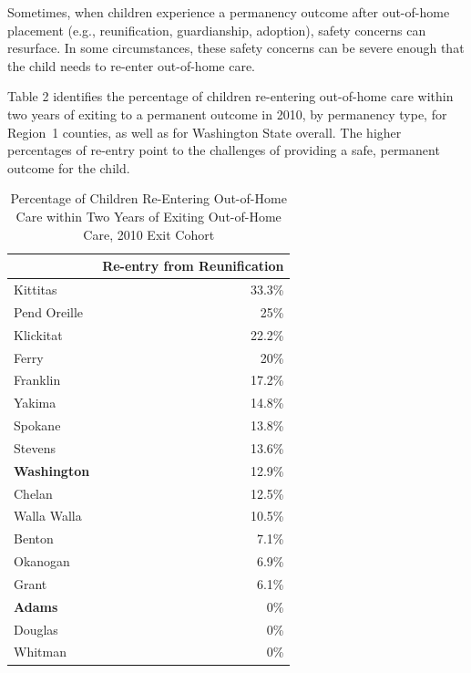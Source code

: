 \documentclass{article}\usepackage[]{graphicx}\usepackage[]{color}
\begin{document}
Sometimes, when children experience a permanency outcome after out-of-home placement (e.g., reunification, guardianship, adoption), safety concerns can resurface. In some circumstances, these safety concerns can be severe enough that the child needs to re-enter out-of-home care.

Table 2 identifies the percentage of children re-entering out-of-home care within two years of exiting to a permanent outcome in 2010, by permanency type, for Region~1 counties, as well as for Washington State overall. The higher percentages of re-entry point to the challenges of providing a safe, permanent outcome for the child.
\vspace{12pt}
\nopagebreak[3]
\begin{table}[ht]
\centering
\caption{Percentage of Children Re-Entering Out-of-Home Care within Two Years of Exiting Out-of-Home Care, 2010 Exit Cohort} 
\begin{tabular}{lr}
  \toprule
 & Re-entry from Reunification \\ 
  \midrule
Kittitas & 33.3\% \\ 
  Pend Oreille & 25\% \\ 
  Klickitat & 22.2\% \\ 
  Ferry & 20\% \\ 
  Franklin & 17.2\% \\ 
  Yakima & 14.8\% \\ 
  Spokane & 13.8\% \\ 
  Stevens & 13.6\% \\ 
  \textbf{Washington} & 12.9\% \\ 
  Chelan & 12.5\% \\ 
  Walla Walla & 10.5\% \\ 
  Benton & 7.1\% \\ 
  Okanogan & 6.9\% \\ 
  Grant & 6.1\% \\ 
  \textbf{Adams} & 0\% \\ 
  Douglas & 0\% \\ 
  Whitman & 0\% \\ 
   \bottomrule
\end{tabular}
\end{table}



\newpage

\end{document}
